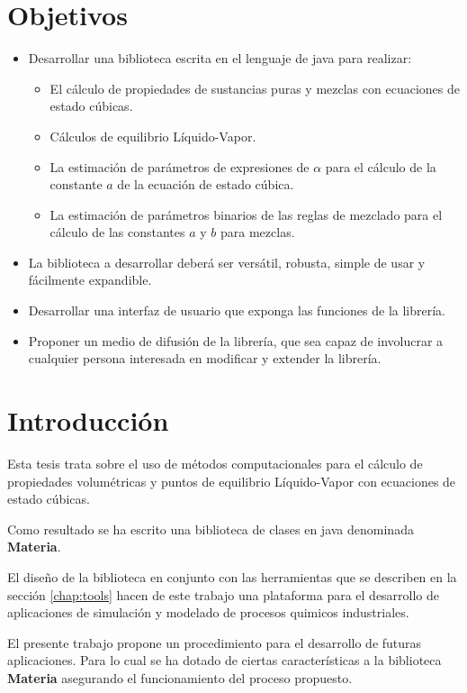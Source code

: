 \chapter{Objetivos}

\begin{itemize}
	\item Desarrollar una biblioteca escrita en el lenguaje de java para realizar:
	\begin{itemize}
		\item El cálculo de propiedades de sustancias puras y mezclas con ecuaciones de estado cúbicas.
		\item Cálculos de equilibrio Líquido-Vapor.
		\item La estimación de parámetros de expresiones de $\alpha$ para el cálculo de la constante $a$ de la ecuación de estado cúbica.
		\item La estimación de parámetros binarios de las reglas de mezclado para el cálculo de las constantes $a$ y $b$ para mezclas.
	\end{itemize}
	\item La biblioteca a desarrollar deberá ser versátil, robusta, simple de usar y fácilmente expandible.
	\item Desarrollar una interfaz de usuario que exponga las funciones de la librería.
	\item Proponer un medio de difusión de la librería, que sea capaz de involucrar a cualquier persona interesada en modificar y extender la librería.
\end{itemize}

\chapter{Introducción}

	Esta tesis trata sobre el uso de métodos computacionales para el cálculo de propiedades volumétricas y puntos de equilibrio Líquido-Vapor con ecuaciones de estado cúbicas. 

	Como resultado se ha escrito una biblioteca de clases en java denominada \textbf{Materia}.

	El diseño de la biblioteca en conjunto con las herramientas que se describen en la sección \ref{chap:tools} hacen de este trabajo una plataforma para el desarrollo de aplicaciones de simulación y modelado de procesos quimicos industriales.

	El presente trabajo propone un procedimiento para el desarrollo de futuras aplicaciones. Para lo cual se ha dotado de ciertas características a la biblioteca \textbf{Materia} asegurando el funcionamiento del proceso propuesto.

